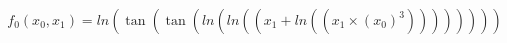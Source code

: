 \documentclass{article}
\begin{document}
\begin{equation}
f_0(x_0,x_1)=ln( \tan( \tan(ln(ln(\left(x_1 + ln(\left(x_1 \times  (x_0 )^3\right))\right))) ) ))
\end{equation}
\end{document}
